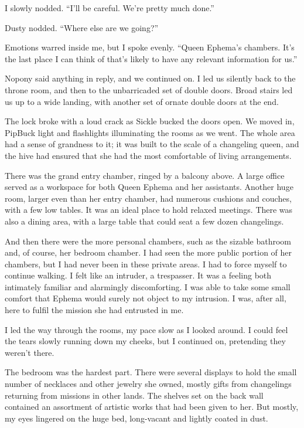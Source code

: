 I slowly nodded. “I’ll be careful. We’re pretty much done.”

Dusty nodded. “Where else are we going?”

Emotions warred inside me, but I spoke evenly. “Queen Ephema’s chambers. It’s the last place I can think of that’s likely to have any relevant information for us.”

Nopony said anything in reply, and we continued on. I led us silently back to the throne room, and then to the unbarricaded set of double doors. Broad stairs led us up to a wide landing, with another set of ornate double doors at the end.

The lock broke with a loud crack as Sickle bucked the doors open. We moved in, PipBuck light and flashlights illuminating the rooms as we went. The whole area had a sense of grandness to it; it was built to the scale of a changeling queen, and the hive had ensured that she had the most comfortable of living arrangements.

There was the grand entry chamber, ringed by a balcony above. A large office served as a workspace for both Queen Ephema and her assistants. Another huge room, larger even than her entry chamber, had numerous cushions and couches, with a few low tables. It was an ideal place to hold relaxed meetings. There was also a dining area, with a large table that could seat a few dozen changelings.

And then there were the more personal chambers, such as the sizable bathroom and, of course, her bedroom chamber. I had seen the more public portion of her chambers, but I had never been in these private areas. I had to force myself to continue walking. I felt like an intruder, a trespasser. It was a feeling both intimately familiar and alarmingly discomforting. I was able to take some small comfort that Ephema would surely not object to my intrusion. I was, after all, here to fulfil the mission she had entrusted in me.

I led the way through the rooms, my pace slow as I looked around. I could feel the tears slowly running down my cheeks, but I continued on, pretending they weren’t there.

The bedroom was the hardest part. There were several displays to hold the small number of necklaces and other jewelry she owned, mostly gifts from changelings returning from missions in other lands. The shelves set on the back wall contained an assortment of artistic works that had been given to her. But mostly, my eyes lingered on the huge bed, long-vacant and lightly coated in dust.

